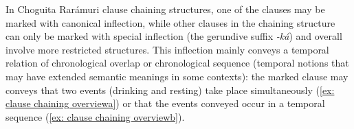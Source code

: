 \ea\label{ex: switch reference reportative overview}

    \label{ex: switch reference reportative overviewa}
        \label{ex: switch reference reportative overviewb}
    \z
\z

In Choguita Rarámuri clause chaining structures, one of the clauses may be marked with canonical inflection, while other clauses in the chaining structure can only be marked with special inflection (the gerundive suffix \textit{-ká}) and overall involve more restricted structures. This inflection mainly conveys a temporal relation of chronological overlap or chronological sequence (temporal notions that may have extended semantic meanings in some contexts): the marked clause may conveys that two events (drinking and resting) take place simultaneously (\ref{ex: clause chaining overviewa}) or that the events conveyed occur in a temporal sequence (\ref{ex: clause chaining overviewb}).

\ea\label{ex: clause chaining overview}

